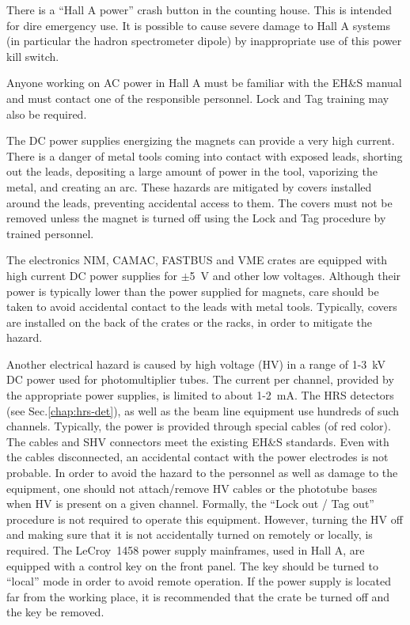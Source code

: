  There is a ``Hall A power'' crash button in the counting house. This is intended for dire emergency use. 
 It is possible to cause severe damage to Hall A systems (in particular the hadron spectrometer dipole) 
 by inappropriate use of this power kill switch.

 Anyone working on AC power in Hall A must be familiar with the EH\&S\cite{EHScebaf} manual 
 and must contact one of the responsible personnel. Lock and Tag training may also be required.

 The DC power supplies energizing the magnets can provide a very high current.
 There is a danger of metal tools coming into contact with exposed leads, shorting out the
 leads, depositing a large amount of power in the tool, vaporizing the metal, and creating an arc.
 These hazards are mitigated by covers installed around the leads,
 preventing accidental access to them. The covers must not be removed
 unless the magnet is turned off using the Lock and Tag procedure by trained
 personnel. 

 The electronics NIM, CAMAC, FASTBUS and VME crates are equipped with high current
 DC power supplies for $\pm$5~V and other low voltages. Although their power 
 is typically lower than the power supplied for magnets,
 care should be taken to avoid accidental contact to the leads with metal tools.
 Typically, covers are installed on the back of the crates or the racks,
 in order to mitigate the hazard. 

 Another electrical hazard is caused by high voltage (HV) in a range of 1-3~kV  DC power used 
 for photomultiplier tubes. The current per channel, provided by the appropriate power supplies,
 is limited to about 1-2~mA. 
 The HRS detectors 
 (see Sec.\ref{chap:hrs-det}), as well as the beam line equipment use 
 hundreds of such channels. 
 Typically, the power is provided through special cables (of red color). The cables and SHV connectors 
 meet the existing EH\&S standards. Even with the cables disconnected, an accidental
 contact with the power electrodes is not probable. In order to avoid the hazard to the personnel
 as well as damage to the equipment, one should not attach/remove HV cables or the
 phototube bases when HV is present on a given channel. Formally, the ``Lock out / Tag out'' 
 procedure is not required to operate this equipment. However, turning the HV off
 and making sure that it is not accidentally turned on remotely or locally, is required.
 The LeCroy~1458 power supply mainframes, used in Hall A, are equipped with
 a control key on the front panel. The key should be turned to ``local'' mode in order to
 avoid remote operation. If the power supply is located far from the working place,
 it is recommended that the crate be turned off and the key be removed.
 

